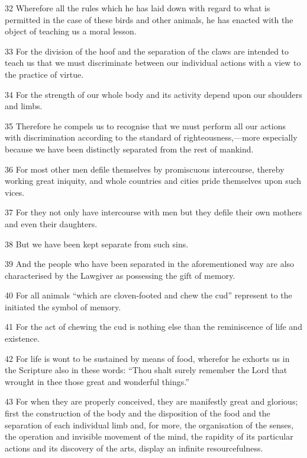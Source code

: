 \par 32 Wherefore all the rules which he has laid down with regard to what is permitted in the case of these birds and other animals, he has enacted with the object of teaching us a moral lesson.

\par 33 For the division of the hoof and the separation of the claws are intended to teach us that we must discriminate between our individual actions with a view to the practice of virtue.

\par 34 For the strength of our whole body and its activity depend upon our shoulders and limbs.

\par 35 Therefore he compels us to recognise that we must perform all our actions with discrimination according to the standard of righteousness,—more especially because we have been distinctly separated from the rest of mankind.

\par 36 For most other men defile themselves by promiscuous intercourse, thereby working great iniquity, and whole countries and cities pride themselves upon such vices.

\par 37 For they not only have intercourse with men but they defile their own mothers and even their daughters.

\par 38 But we have been kept separate from such sins.

\par 39 And the people who have been separated in the aforementioned way are also characterised by the Lawgiver as possessing the gift of memory.

\par 40 For all animals “which are cloven-footed and chew the cud” represent to the initiated the symbol of memory.

\par 41 For the act of chewing the cud is nothing else than the reminiscence of life and existence.

\par 42 For life is wont to be sustained by means of food, wherefor he exhorts us in the Scripture also in these words: “Thou shalt surely remember the Lord that wrought in thee those great and wonderful things.”

\par 43 For when they are properly conceived, they are manifestly great and glorious; first the construction of the body and the disposition of the food and the separation of each individual limb and, for more, the organisation of the senses, the operation and invisible movement of the mind, the rapidity of its particular actions and its discovery of the arts, display an infinite resourcefulness.

